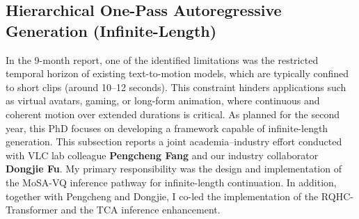 \documentclass[a4paper,12pt]{article}
\begin{document}
\newpage

\subsection{Hierarchical One-Pass Autoregressive Generation (Infinite-Length)}


In the 9-month report, one of the identified limitations was the restricted temporal horizon of existing text-to-motion models, which are typically confined to short clips (around 10--12 seconds). This constraint hinders applications such as virtual avatars, gaming, or long-form animation, where continuous and coherent motion over extended durations is critical. As planned for the second year, this PhD focuses on developing a framework capable of infinite-length generation. This subsection reports a joint academia–industry effort conducted with VLC lab colleague \textbf{Pengcheng Fang} and our industry collaborator \textbf{Dongjie Fu}. My primary responsibility was the design and implementation of the MoSA-VQ inference pathway for infinite-length continuation. In addition, together with Pengcheng and Dongjie, I co-led the implementation of the RQHC-Transformer and the TCA inference enhancement.
\end{document}
